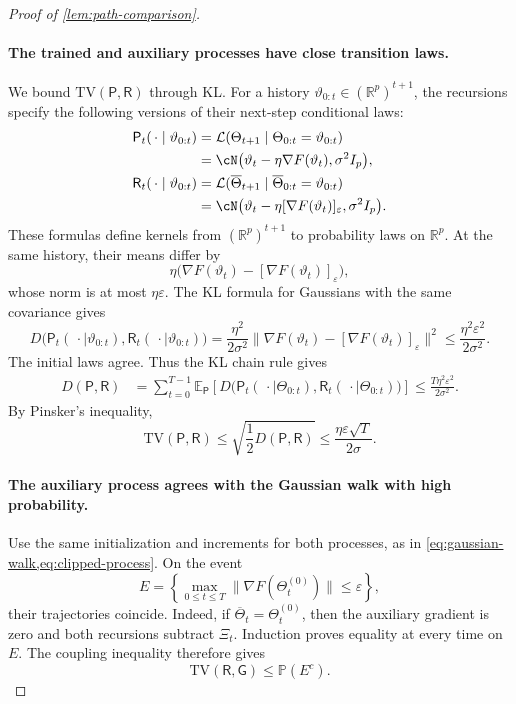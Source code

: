 \documentclass[11pt,twoside]{article}
\newcommand{\E}{\mathbb E}
\renewcommand{\P}{\mathbb P}
\newcommand{\Law}{\mathcal L}
\newcommand{\R}{\mathbb R}
\newcommand{\KL}{D}
\newcommand{\TV}{\mathrm{TV}}
\theoremstyle{definition}
\theoremstyle{remark}
\begin{document}
\begin{proof}[Proof of \cref{lem:path-comparison}]
\paragraph{The trained and auxiliary processes have close transition laws.}
We bound $\TV(\mathsf P,\mathsf R)$ through KL. For a history
$\vartheta_{0:t}\in(\R^p)^{t+1}$, the recursions specify the following
versions of their next-step conditional laws:
\begin{align*}
\mathsf P_t(\,\cdot\mid\vartheta_{0:t})
&=\Law(\Theta_{t+1}\mid\Theta_{0:t}=\vartheta_{0:t})\\
&=\cN\bigl(\vartheta_t-\eta\nabla F(\vartheta_t),\sigma^2I_p\bigr),\\
\mathsf R_t(\,\cdot\mid\vartheta_{0:t})
&=\Law(\overline\Theta_{t+1}\mid
             \overline\Theta_{0:t}=\vartheta_{0:t})\\
&=\cN\bigl(\vartheta_t-\eta[\nabla F(\vartheta_t)]_\varepsilon,
             \sigma^2I_p\bigr).
\end{align*}
These formulas define kernels from $(\R^p)^{t+1}$ to probability laws on
$\R^p$. At the same history, their means differ by
\[
\eta\bigl(\nabla F(\vartheta_t)-[\nabla F(\vartheta_t)]_\varepsilon\bigr),
\]
whose norm is at most $\eta\varepsilon$. The KL formula for Gaussians with
the same covariance gives
\[
\KL\bigl(\mathsf P_t(\,\cdot\mid\vartheta_{0:t}),
\mathsf R_t(\,\cdot\mid\vartheta_{0:t})\bigr)
=\frac{\eta^2}{2\sigma^2}
\bigl\|\nabla F(\vartheta_t)-[\nabla F(\vartheta_t)]_\varepsilon\bigr\|^2
\le\frac{\eta^2\varepsilon^2}{2\sigma^2}.
\]
The initial laws agree. Thus the KL chain rule gives
\begin{align}
\KL(\mathsf P,\mathsf R)
&=\sum_{t=0}^{T-1}\E_{\mathsf P}\!\left[
\KL\bigl(\mathsf P_t(\,\cdot\mid\Theta_{0:t})
,\mathsf R_t(\,\cdot\mid\Theta_{0:t})\bigr)\right]
\le\frac{T\eta^2\varepsilon^2}{2\sigma^2}.
\label{eq:path-kl}
\end{align}
By Pinsker's inequality,
\begin{equation}
\TV(\mathsf P,\mathsf R)
\le\sqrt{\frac12\KL(\mathsf P,\mathsf R)}
\le\frac{\eta\varepsilon\sqrt T}{2\sigma}.
\label{eq:actual-aux-tv}
\end{equation}

\paragraph{The auxiliary process agrees with the Gaussian walk with high probability.}
Use the same initialization and increments for both processes, as in
\cref{eq:gaussian-walk,eq:clipped-process}. On the event
\[
E=\left\{\max_{0\le t\le T}\|\nabla F(\Theta_t^{(0)})\|
\le\varepsilon\right\},
\]
their trajectories coincide. Indeed, if
$\overline\Theta_t=\Theta_t^{(0)}$, then the auxiliary gradient is zero and
both recursions subtract $\Xi_t$. Induction proves equality at every time
on $E$. The coupling inequality therefore gives
\[
\TV(\mathsf R,\mathsf G)\le\P(E^c).
\]


\end{proof}
\end{document}
